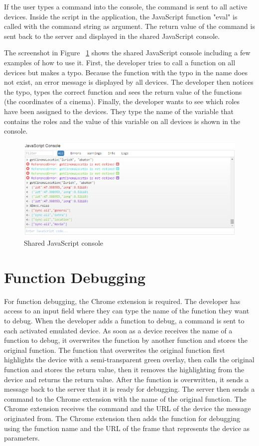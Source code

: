 If the user types a command into the console, the command is sent to all active devices. Inside the script in the application, the JavaScript function "eval" is called with the command string as argument. The return value of the command is sent back to the server and displayed in the shared JavaScript console.

The screenshot in Figure ~\ref{fig:js_console} shows the shared JavaScript console including a few examples of how to use it. First, the developer tries to call a function on all devices but makes a typo. Because the function with the typo in the name does not exist, an error message is displayed by all devices. The developer then notices the typo, types the correct function and sees the return value of the functions (the coordinates of a cinema). Finally, the developer wants to see which roles have been assigned to the devices. They type the name of the variable that contains the roles and the value of this variable on all devices is shown in the console.

\begin{figure}[H]
  \centering
    \includegraphics[width=1.0\textwidth]{images/screenshots/js_console_2.png}
	\caption{Shared JavaScript console}
	\label{fig:js_console}
\end{figure}

\section{Function Debugging}

For function debugging, the Chrome extension is required. The developer has access to an input field where they can type the name of the function they want to debug. When the developer adds a function to debug, a command is sent to each activated emulated device. As soon as a device receives the name of a function to debug, it overwrites the function by another function and stores the original function. The function that overwrites the original function first highlights the device with a semi-transparent green overlay, then calls the original function and stores the return value, then it removes the highlighting from the device and returns the return value. After the function is overwritten, it sends a message back to the server that it is ready for debugging. The server then sends a command to the Chrome extension with the name of the original function. The Chrome extension receives the command and the URL of the device the message originated from. The Chrome extension then adds the function for debugging using the function name and the URL of the frame that represents the device as parameters. 

